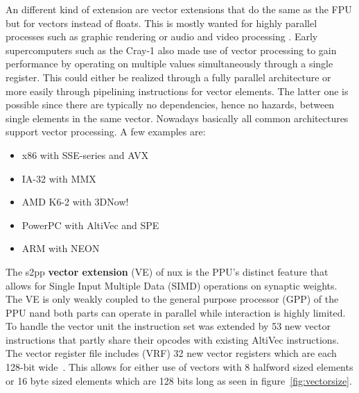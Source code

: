 An different kind of extension are vector extensions that do the same as the FPU but for vectors instead of floats.
This is mostly wanted for highly parallel processes such as graphic rendering or audio and video processing .
Early supercomputers such as the Cray-1  also made use of vector processing to gain performance by operating on multiple values  simultaneously through a single register.
This could either be realized through a fully parallel architecture or more easily through pipelining instructions for vector elements.
The latter one is possible since there are typically no dependencies, hence no hazards, between single elements in the same vector.
Nowadays basically all common architectures support vector processing.
A few examples are:

\noindent\begin{minipage}{\textwidth}
    \vspace{1em}
    \begin{minipage}{0.4\textwidth}
\begin{itemize}
    \item x86 with SSE-series and AVX
    \item IA-32 with MMX
    \item AMD K6-2 with 3DNow!
\end{itemize}
\end{minipage}
    \begin{minipage}{0.6\textwidth}
\begin{itemize}
    \item PowerPC with AltiVec and SPE
    \item ARM with NEON
\end{itemize}
\end{minipage}
    \vspace{1em}
\end{minipage}

The s2pp \textbf{vector extension} (VE) of nux is the PPU's distinct feature that allows for Single Input Multiple Data (SIMD) operations on synaptic weights.
The VE is only weakly coupled to the general purpose processor (GPP) of the PPU nand both parts can operate in parallel while interaction is highly limited.
To handle the vector unit the instruction set was extended by 53 new vector instructions that partly share their opcodes with existing AltiVec instructions.
The vector register file includes (VRF) 32 new vector registers which are each 128-bit wide~\citep{AV:registers}.
This allows for either use of vectors with 8 halfword sized elements or 16 byte sized elements which are 128 bits long as seen in figure~\ref{fig:vectorsize}.

